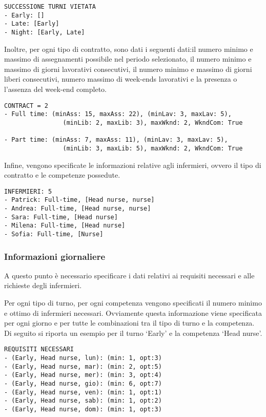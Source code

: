 \begin{verbatim}
SUCCESSIONE TURNI VIETATA
- Early: []
- Late: [Early]
- Night: [Early, Late]

\end{verbatim}

Inoltre, per ogni tipo di contratto, sono dati i seguenti dati:il numero minimo e massimo di assegnamenti possibile nel periodo selezionato, il numero minimo e massimo di giorni lavorativi consecutivi, il numero minimo e massimo di giorni liberi consecutivi, numero massimo di week-ends lavorativi e la presenza o l'assenza del week-end completo.

\begin{verbatim}
CONTRACT = 2
- Full time: (minAss: 15, maxAss: 22), (minLav: 3, maxLav: 5), 
				(minLib: 2, maxLib: 3), maxWknd: 2, WkndCom: True
				
- Part time: (minAss: 7, maxAss: 11), (minLav: 3, maxLav: 5), 
				(minLib: 3, maxLib: 5), maxWknd: 2, WkndCom: True
\end{verbatim}

Infine, vengono specificate le informazioni relative agli infermieri, ovvero il tipo di contratto e le competenze possedute.
\begin{verbatim}
INFERMIERI: 5
- Patrick: Full-time, [Head nurse, nurse]
- Andrea: Full-time, [Head nurse, nurse]
- Sara: Full-time, [Head nurse]
- Milena: Full-time, [Head nurse]
- Sofia: Full-time, [Nurse]
\end{verbatim}

\subsubsection*{Informazioni giornaliere}
A questo punto è necessario specificare i dati relativi ai requisiti necessari e alle richieste degli infermieri.

Per ogni tipo di turno, per ogni competenza vengono specificati il numero minimo e ottimo di infermieri necessari. Ovviamente questa informazione viene specificata per ogni giorno e per tutte le combinazioni tra il tipo di turno e la competenza.
Di seguito si riporta un esempio per il turno `Early' e la competenza `Head nurse'.

\begin{verbatim}
REQUISITI NECESSARI
- (Early, Head nurse, lun): (min: 1, opt:3)
- (Early, Head nurse, mar): (min: 2, opt:5)
- (Early, Head nurse, mer): (min: 3, opt:4)
- (Early, Head nurse, gio): (min: 6, opt:7)
- (Early, Head nurse, ven): (min: 1, opt:1)
- (Early, Head nurse, sab): (min: 1, opt:2)
- (Early, Head nurse, dom): (min: 1, opt:3)
\end{verbatim}

